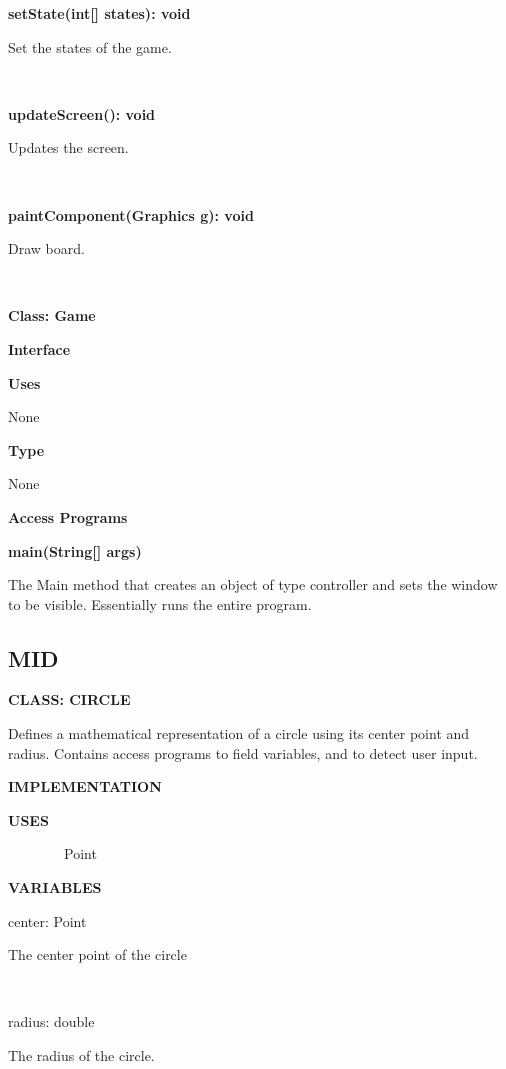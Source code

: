 \documentclass{article}
\begin{document}
{{\textbf{setState(int{[}{]} states): void}}

{Set the states of the game.}

{~~~~~~~~~~~~~~~~}

{\textbf{updateScreen(): void}}

{Updates the screen. }

{~~~~~~~~~~~~~~~~}

{\textbf{paintComponent(Graphics g): void}}

{Draw board.~~~~~~~~}

{}

{~~~~~~~~~~~~~~~~}

{\textbf{Class: Game}}

{\textbf{Interface}}

{\textbf{Uses}}

None

{\textbf{Type}}

None

{\textbf{Access Programs}}

{\textbf{main(String{[}{]} args)}}

{The Main method that creates an object of type controller and
sets the window to be visible. Essentially runs the entire program. }

{}

{}

\subsection{MID}

{}

{\textbf{CLASS: CIRCLE}}

{Defines a mathematical representation of a circle using its center
point and radius. Contains access programs to field variables, and to
detect user input.}

{\textbf{IMPLEMENTATION}}

{}

{\textbf{USES}}

{~~~~~~~~Point}

{\textbf{VARIABLES}}

{center: Point}

{The center point of the circle}

{~}

{radius: double}

{The radius of the circle.}

{}

{~}

}
\end{document}
